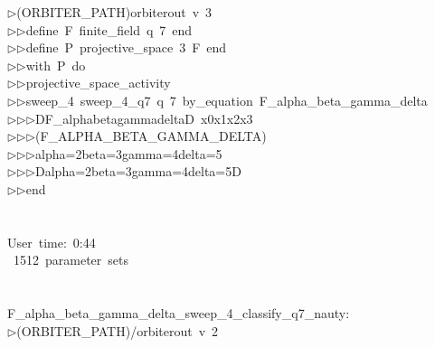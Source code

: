\begin{tabbing}
$\triangleright$\>(ORBITER\_PATH)orbiterout\ v\ 3\ \\[0pt]
$\triangleright$\>$\triangleright$\>define\ F\ finite\_field\ q\ 7\ end\ \\[0pt]
$\triangleright$\>$\triangleright$\>define\ P\ projective\_space\ 3\ F\ end\ \\[0pt]
$\triangleright$\>$\triangleright$\>with\ P\ do\ \\[0pt]
$\triangleright$\>$\triangleright$\>projective\_space\_activity\ \\[0pt]
$\triangleright$\>$\triangleright$\>sweep\_4\ sweep\_4\_q7\ q\ 7\ by\_equation\ F\_alpha\_beta\_gamma\_delta\ \\[0pt]
$\triangleright$\>$\triangleright$\>$\triangleright$\>DF\_alphabetagammadeltaD\ x0x1x2x3\ \\[0pt]
$\triangleright$\>$\triangleright$\>$\triangleright$\>(F\_ALPHA\_BETA\_GAMMA\_DELTA)\ \\[0pt]
$\triangleright$\>$\triangleright$\>$\triangleright$\>alpha=2beta=3gamma=4delta=5\ \\[0pt]
$\triangleright$\>$\triangleright$\>$\triangleright$\>Dalpha=2beta=3gamma=4delta=5D\ \\[0pt]
$\triangleright$\>$\triangleright$\>end\\[0pt]
\\[0pt]
\\[0pt]
User\ time:\ 0:44\\[0pt]
\ 1512\ parameter\ sets\\[0pt]
\\[0pt]
\\[0pt]
F\_alpha\_beta\_gamma\_delta\_sweep\_4\_classify\_q7\_nauty:\\[0pt]
$\triangleright$\>(ORBITER\_PATH)/orbiterout\ v\ 2\ \\[0pt]

\end{tabbing}
